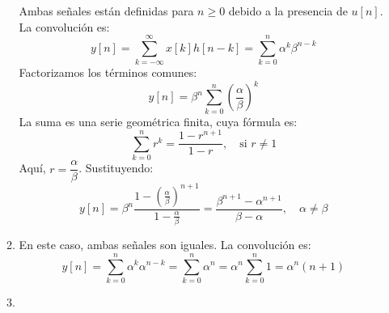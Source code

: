 \begin{enumerate}[label=\color{red}\textbf{\arabic*)}]
\begin{enumerate}[label=\color{red}\textbf{\alph*)}]
        Ambas señales están definidas para $n\ge 0$ debido a la presencia de $u[n]$. La convolución es:  \[
            y[n]=\sum_{k=-\infty}^{\infty} x[k]h[n-k]=\sum_{k=0}^{n} \alpha^k\beta^{n-k}
        \] 
        Factorizamos los términos comunes: \[
            y[n]=\beta^n \sum_{k=0}^{n} \left( \dfrac{\alpha}{\beta} \right) ^k
        \] 
        La suma es una serie geométrica finita, cuya fórmula es: \[
        \sum_{k=0}^{n} r^k=\dfrac{1-r^{n+1}}{1-r},\quad \text{si }r\neq 1
        \] 
        Aquí, $r=\dfrac{\alpha}{\beta}$. Sustituyendo: \[
            y[n]=\beta^n\dfrac{1-\left( \frac{\alpha}{\beta}  \right) ^{n+1}}{1-\frac{\alpha}{\beta} }=\dfrac{\beta^{n+1}-\alpha^{n+1}}{\beta-\alpha},\quad \alpha\neq \beta
        \] 
    \item {} 

        En este caso, ambas señales son iguales. La convolución es: \[
            y[n]=\sum_{k=0}^{n} \alpha^k\alpha^{n-k}=\sum_{k=0}^{n} \alpha^n=\alpha^n \sum_{k=0}^{n} 1=\alpha^n(n+1)
        \] 
    \item {} 


\end{enumerate}
\end{enumerate}
